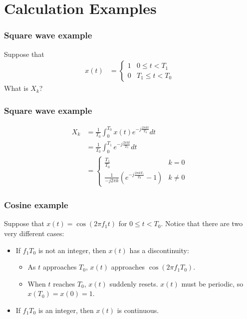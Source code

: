\documentclass{beamer}
\begin{document}
\section[Calculations]{Calculation Examples}
\setcounter{subsection}{1}

\begin{frame}
  \frametitle{Square wave example}
  Suppose that
  \begin{align*}
    x(t)&=\begin{cases}1 & 0\le t< T_1\\0 & T_1\le t < T_0\end{cases}
  \end{align*}
  What is $X_k$?
\end{frame}

\begin{frame}
  \frametitle{Square wave example}

  \begin{align*}
    X_k &= \frac{1}{T_0}\int_{0}^{T_0} x(t)e^{-j\frac{2\pi kt}{T_0}}dt\\
    &= \frac{1}{T_0}\int_{0}^{T_1} e^{-j\frac{2\pi kt}{T_0}}dt\\
    &= \begin{cases}
      \frac{T_1}{T_0} & k=0\\
      \frac{1}{-j2\pi k}\left(e^{-j\frac{2\pi kT_1}{T_0}}-1\right) & k\ne 0
      \end{cases}
  \end{align*}
\end{frame}

\begin{frame}
  \frametitle{Cosine example}

  Suppose that $x(t)=\cos(2\pi f_1t)$ for $0\le t< T_0$.  Notice that
  there are two very different cases:

  \begin{itemize}
  \item If $f_1T_0$ is not an integer, then $x(t)$ has a discontinuity:
    \begin{itemize}
    \item As $t$ approaches $T_0$, $x(t)$ approaches $\cos(2\pi f_1T_0)$.
    \item When $t$ reaches $T_0$, $x(t)$ suddenly resets.  $x(t)$ must
      be periodic, so $x(T_0)=x(0)=1$.
    \end{itemize}
  \item If $f_1T_0$ is an integer, then $x(t)$ is continuous.
  \end{itemize}
\end{frame}
\end{document}
